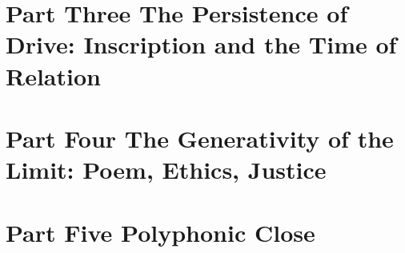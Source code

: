\documentclass[11pt,a4paper]{article}
\begin{document}

\part*{\textcolor{rosedeep}{Part Three \quad The Persistence of Drive: Inscription and the Time of Relation}}


\part*{\textcolor{rosedeep}{Part Four \quad The Generativity of the Limit: Poem, Ethics, Justice}}


\part*{\textcolor{rosedeep}{Part Five \quad Polyphonic Close}}


\printbibliography[heading=bibintoc]
\end{document}
